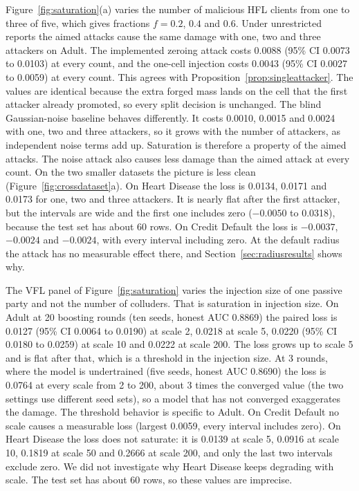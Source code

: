 \documentclass[11pt]{article}
\newcommand{\rev}[1]{#1}
\begin{document}
\rev{Figure~\ref{fig:saturation}(a) varies the number of malicious HFL clients from one to three of five, which gives fractions $f=0.2$, $0.4$ and $0.6$. Under unrestricted reports the aimed attacks cause the same damage with one, two and three attackers on Adult. The implemented zeroing attack costs 0.0088 (95\% CI 0.0073 to 0.0103) at every count, and the one-cell injection costs 0.0043 (95\% CI 0.0027 to 0.0059) at every count. This agrees with Proposition~\ref{prop:singleattacker}. The values are identical because the extra forged mass lands on the cell that the first attacker already promoted, so every split decision is unchanged. The blind Gaussian-noise baseline behaves differently. It costs 0.0010, 0.0015 and 0.0024 with one, two and three attackers, so it grows with the number of attackers, as independent noise terms add up. Saturation is therefore a property of the aimed attacks. The noise attack also causes less damage than the aimed attack at every count. On the two smaller datasets the picture is less clean (Figure~\ref{fig:crossdataset}a). On Heart Disease the loss is 0.0134, 0.0171 and 0.0173 for one, two and three attackers. It is nearly flat after the first attacker, but the intervals are wide and the first one includes zero ($-0.0050$ to 0.0318), because the test set has about 60 rows. On Credit Default the loss is $-0.0037$, $-0.0024$ and $-0.0024$, with every interval including zero. At the default radius the attack has no measurable effect there, and Section~\ref{sec:radiusresults} shows why.}

\rev{The VFL panel of Figure~\ref{fig:saturation} varies the injection size of one passive party and not the number of colluders. That is saturation in injection size.} \rev{On Adult at 20 boosting rounds (ten seeds, honest AUC 0.8869) the paired loss is 0.0127 (95\% CI 0.0064 to 0.0190) at scale 2, 0.0218 at scale 5, 0.0220 (95\% CI 0.0180 to 0.0259) at scale 10 and 0.0222 at scale 200. The loss grows up to scale 5 and is flat after that, which is a threshold in the injection size. At 3 rounds, where the model is undertrained (five seeds, honest AUC 0.8690) the loss is 0.0764 at every scale from 2 to 200, about 3 times the converged value (the two settings use different seed sets), so a model that has not converged exaggerates the damage. The threshold behavior is specific to Adult. On Credit Default no scale causes a measurable loss (largest 0.0059, every interval includes zero). On Heart Disease the loss does not saturate: it is 0.0139 at scale 5, 0.0916 at scale 10, 0.1819 at scale 50 and 0.2666 at scale 200, and only the last two intervals exclude zero. We did not investigate why Heart Disease keeps degrading with scale. The test set has about 60 rows, so these values are imprecise.}
\end{document}
